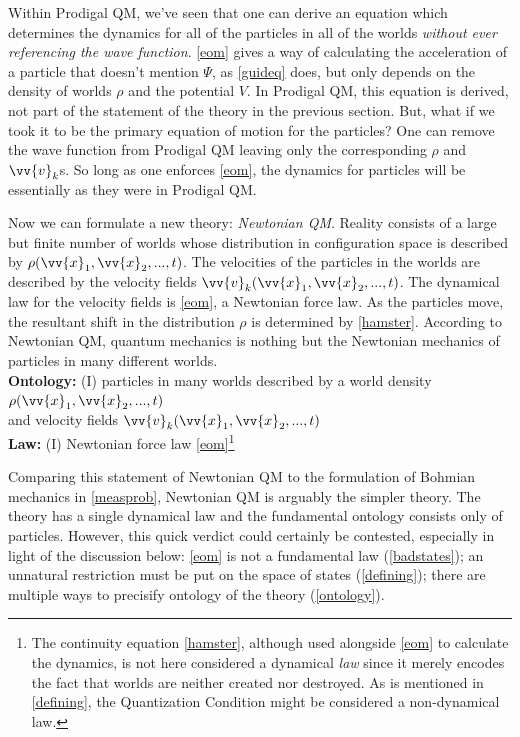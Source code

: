 \documentclass[12pt,secnumarabic,balancelastpage,amsmath,amssymb,nofootinbib]{article}
\begin{document}
Within Prodigal QM, we've seen that one can derive an equation which determines the dynamics for all of the particles in all of the worlds \emph{without ever referencing the wave function}.  \eqref{eom} gives a way of calculating the acceleration of a particle that doesn't mention $\Psi$, as \eqref{guideq} does, but only depends on the density of worlds $\rho$ and the potential $V$.  In Prodigal QM, this equation is derived, not part of the statement of the theory in the previous section.  But, what if we took it to be the primary equation of motion for the particles?  One can remove the wave function from Prodigal QM leaving only the corresponding $\rho$ and $\vv{v}_k$s.  So long as one enforces \eqref{eom}, the dynamics for particles will be essentially as they were in Prodigal QM.

Now we can formulate a new theory: \emph{Newtonian QM}.  Reality consists of a large but finite number of worlds whose distribution in configuration space is described by $\rho(\vv{x}_1,\vv{x}_2,...,t)$.  The velocities of the particles in the worlds are described by the velocity fields $\vv{v}_k(\vv{x}_1,\vv{x}_2,...,t)$.  The dynamical law for the velocity fields is \eqref{eom}, a Newtonian force law.  As the particles move, the resultant shift in the distribution $\rho$ is determined by \eqref{hamster}.  According to Newtonian QM, quantum mechanics is nothing but the Newtonian mechanics of particles in many different worlds.
\vspace*{6 pt}\\\hspace*{1.2cm}\textbf{Ontology:} (I) particles in many worlds described by a world density $\rho(\vv{x}_1,\vv{x}_2,...,t)$
\\\hspace*{1.2cm}and velocity fields $\vv{v}_k(\vv{x}_1,\vv{x}_2,...,t)$
\\\hspace*{1.2cm}\textbf{Law:} (I) Newtonian force law \eqref{eom}\footnote{The continuity equation \eqref{hamster}, although used alongside \eqref{eom} to calculate the dynamics, is not here considered a dynamical \emph{law} since it merely encodes the fact that worlds are neither created nor destroyed.  As is mentioned in \textsection \ref{defining}, the Quantization Condition might be considered a non-dynamical law.}\vspace*{6 pt}

Comparing this statement of Newtonian QM to the formulation of Bohmian mechanics in \textsection \ref{measprob}, Newtonian QM is arguably the simpler theory.  The theory has a single dynamical law and the fundamental ontology consists only of particles.  However, this quick verdict could certainly be contested, especially in light of the discussion below: \eqref{eom} is not a fundamental law (\textsection \ref{badstates}); an unnatural restriction must be put on the space of states (\textsection \ref{defining}); there are multiple ways to precisify ontology of the theory (\textsection \ref{ontology}).
\end{document}
